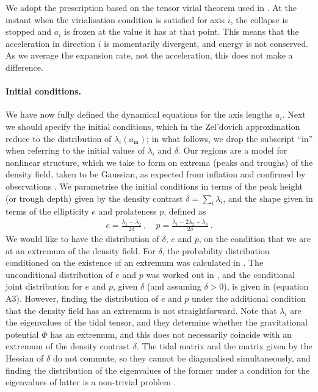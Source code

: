 \documentclass[11pt, a4paper]{article}
\newcommand{\bea}{\begin{eqnarray}} \newcommand{\eea}{\end{eqnarray}}
\newcommand{\para}{\paragraph}
\renewcommand{\d}{\delta}
\renewcommand{\l}{\lambda}
\renewcommand{\in}{\textrm{in}}
\begin{document}
We adopt the prescription based on the tensor virial theorem used in \cite{Angrick:2010qg}. At the instant when the virialisation condition is satisfied for axis $i$, the collapse is stopped and $a_i$ is frozen at the value it has at that point. This means that the acceleration in direction $i$ is momentarily divergent, and energy is not conserved. As we average the expansion rate, not the acceleration, this does not make a difference.

\para{Initial conditions.}

We have now fully defined the dynamical equations for the axis lengths $a_i$. Next we should specify the initial conditions, which in the Zel'dovich approximation reduce to the distribution of $\l_i(a_\in)$; in what follows, we drop the subscript ``$\in$'' when referring to the initial values of $\l_i$ and $\d$. Our regions are a model for nonlinear structure, which we take to form on extrema (peaks and troughs) of the density field, taken to be Gaussian, as expected from inflation and confirmed by observations \cite{Ade:2015xua}.
We parametrise the initial conditions in terms of the peak height (or trough depth) given by the density contrast $\delta=\sum_i\l_i$, and the shape given in terms of the ellipticity $e$ and prolateness $p$, defined as
\bea
  e = \frac{\l_1 - \l_2}{2\d} \ , \quad p = \frac{\l_1 - 2 \l_2 + \l_3}{2\d} \ .
\eea
%
We would like to have the distribution of $\d$, $e$ and $p$, on the condition that we are at an extremum of the density field. For $\d$, the probability distribution conditioned on the existence of an extremum was calculated in \cite{Bardeen:1986}. The unconditional distribution of $e$ and $p$ was worked out in \cite{Zeldovich:1970, Doroshkevich:1970}, and the conditional joint distribution for $e$ and $p$, given $\d$ (and assuming $\d>0$), is given in \cite{Sheth:1999su} (equation A3).
However, finding the distribution of $e$ and $p$ under the additional condition that the density field has an extremum is not straightforward. Note that $\l_i$ are the eigenvalues of the tidal tensor, and they determine whether the gravitational potential $\Phi$ has an extremum, and this does not necessarily coincide with an extremum of the density contrast $\d$. The tidal matrix and the matrix given by the Hessian of $\d$ do not commute, so they cannot be diagonalised simultaneously, and finding the distribution of the eigenvalues of the former under a condition for the eigenvalues of latter is a non-trivial problem \cite{Angrick:2013wba}.
\end{document}
